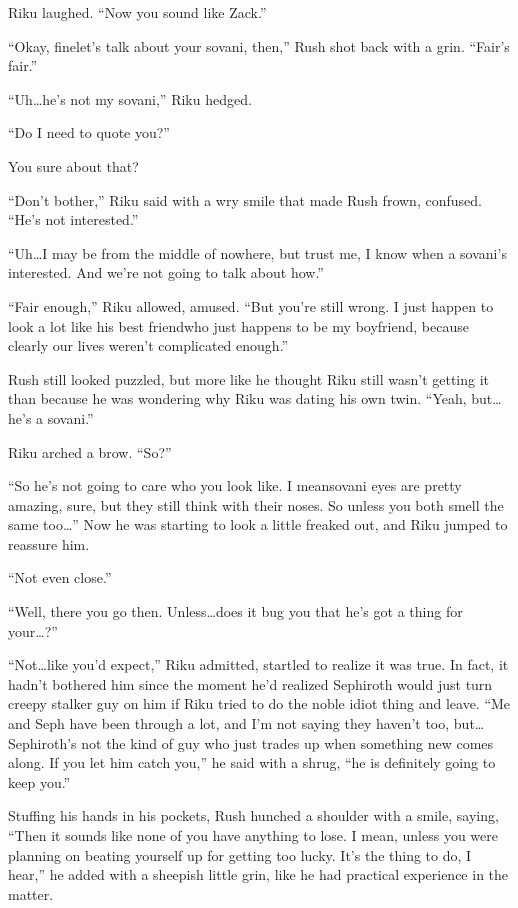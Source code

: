 Riku laughed. ``Now you sound like Zack.''

``Okay, fine\textemdash let's talk about your sovani, then,'' Rush shot back with a grin. ``Fair's fair.''

``Uh\ldots he's not my sovani,'' Riku hedged.

``Do I need to quote you?''

You sure about that?

``Don't bother,'' Riku said with a wry smile that made Rush frown, confused. ``He's not interested.''

``Uh\ldots I may be from the middle of nowhere, but trust me, I know when a sovani's interested. And we're not going to talk about how.''

``Fair enough,'' Riku allowed, amused. ``But you're still wrong. I just happen to look a lot like his best friend\textemdash who just happens to be my boyfriend, because clearly our lives weren't complicated enough.''

Rush still looked puzzled, but more like he thought Riku still wasn't getting it than because he was wondering why Riku was dating his own twin. ``Yeah, but\ldots he's a sovani.''

Riku arched a brow. ``So?''

``So he's not going to care who you look like. I mean\textemdash sovani eyes are pretty amazing, sure, but they still think with their noses. So unless you both smell the same too\ldots'' Now he was starting to look a little freaked out, and Riku jumped to reassure him.

``Not even close.''

``Well, there you go then. Unless\ldots does it bug you that he's got a thing for your\ldots ?''

``Not\ldots like you'd expect,'' Riku admitted, startled to realize it was true. In fact, it hadn't bothered him since the moment he'd realized Sephiroth would just turn creepy stalker guy on him if Riku tried to do the noble idiot thing and leave. ``Me and Seph have been through a lot, and I'm not saying they haven't too, but\ldots Sephiroth's not the kind of guy who just trades up when something new comes along. If you let him catch you,'' he said with a shrug, ``he is definitely going to keep you.''

Stuffing his hands in his pockets, Rush hunched a shoulder with a smile, saying, ``Then it sounds like none of you have anything to lose. I mean, unless you were planning on beating yourself up for getting too lucky. It's the thing to do, I hear,'' he added with a sheepish little grin, like he had practical experience in the matter.


